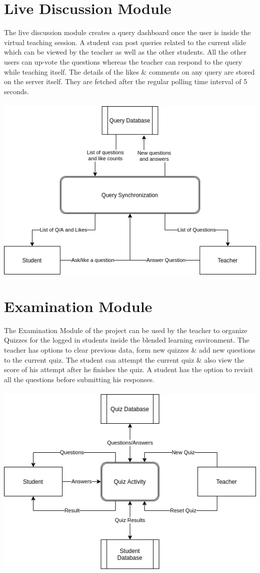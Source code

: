 \documentclass[10pt]{report}
\begin{document}
\section{Live Discussion Module}
The live discussion module creates a query dashboard once the user is inside the virtual teaching session. A student can post queries related to the current slide which can be viewed by the teacher as well as the other students. All the other users can up-vote the questions whereas the teacher can respond to the query while teaching itself. The details of the likes \& comments on any query are stored on the server itself. They are fetched after the regular polling time interval of 5 seconds. 	\\ \\
\includegraphics[width=\textwidth]{QuerySynchronization.png} \newpage
\section{Examination Module}
The Examination Module of the project can be used by the teacher to organize Quizzes for the logged in students inside the blended learning environment. The teacher has options to clear previous data, form new quizzes \& add new questions to the current quiz. The student can attempt the current quiz \& also view the score of his attempt after he finishes the quiz. A student has the option to revisit all the questions before submitting his responses. \\ \\
\includegraphics[width=\textwidth]{QuizModule.png} \newpage
\end{document}
